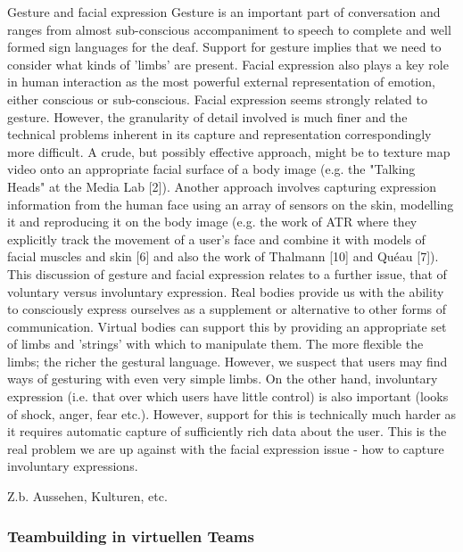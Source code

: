 \documentclass[a4paper,11pt]{article}%
\renewcommand{\\}{\vspace*{0.5\baselineskip} \newline}
\begin{document}
Gesture and facial expression
Gesture is an important part of conversation and ranges from almost sub-conscious accompaniment to speech to complete and well formed sign languages for the deaf. Support for gesture implies that we need to consider what kinds of 'limbs' are present. Facial expression also plays a key role in human interaction as the most powerful external representation of emotion, either conscious or sub-conscious. Facial expression seems strongly related to gesture. However, the granularity of detail involved is much finer and the technical problems inherent in its capture and representation correspondingly more difficult. A crude, but possibly effective approach, might be to texture map video onto an appropriate facial surface of a body image (e.g. the "Talking Heads" at the Media Lab [2]). Another approach involves capturing expression information from the human face using an array of sensors on the skin, modelling it and reproducing it on the body image (e.g. the work of ATR where they explicitly track the movement of a user's face and combine it with models of facial muscles and skin [6] and also the work of Thalmann [10] and Quéau [7]).
This discussion of gesture and facial expression relates to a further issue, that of voluntary versus involuntary expression. Real bodies provide us with the ability to consciously express ourselves as a supplement or alternative to other forms of communication. Virtual bodies can support this by providing an appropriate set of limbs and 'strings' with which to manipulate them. The more flexible the limbs; the richer the gestural language. However, we suspect that users may find ways of gesturing with even very simple limbs. On the other hand, involuntary expression (i.e. that over which users have little control) is also important (looks of shock, anger, fear etc.). However, support for this is technically much harder as it requires automatic capture of sufficiently rich data about the user. This is the real problem we are up against with the facial expression issue - how to capture involuntary expressions.



	Z.b. Aussehen, Kulturen, etc.	
	
	\subsubsection{Teambuilding in virtuellen Teams}
\end{document}
